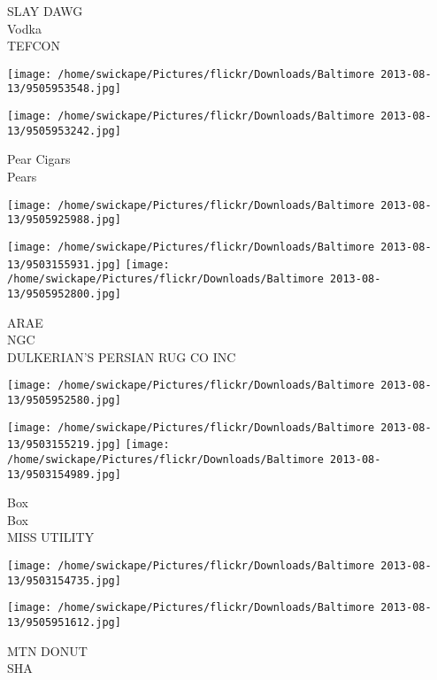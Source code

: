 \documentclass[10pt,letterpaper]{article}
\begin{document}
SLAY DAWG\\
Vodka\\
TEFCON\\
\pagebreak

\texttt{[image: /home/swickape/Pictures/flickr/Downloads/Baltimore 2013-08-13/9505953548.jpg]}

\vspace{0.25in}
\texttt{[image: /home/swickape/Pictures/flickr/Downloads/Baltimore 2013-08-13/9505953242.jpg]}

Pear Cigars\\
Pears\\
\pagebreak

\texttt{[image: /home/swickape/Pictures/flickr/Downloads/Baltimore 2013-08-13/9505925988.jpg]}

\vspace{0.25in}
\texttt{[image: /home/swickape/Pictures/flickr/Downloads/Baltimore 2013-08-13/9503155931.jpg]}
\texttt{[image: /home/swickape/Pictures/flickr/Downloads/Baltimore 2013-08-13/9505952800.jpg]}

ARAE\\
NGC\\
DULKERIAN'S PERSIAN RUG CO INC\\
\pagebreak

\texttt{[image: /home/swickape/Pictures/flickr/Downloads/Baltimore 2013-08-13/9505952580.jpg]}

\vspace{0.25in}
\texttt{[image: /home/swickape/Pictures/flickr/Downloads/Baltimore 2013-08-13/9503155219.jpg]}
\texttt{[image: /home/swickape/Pictures/flickr/Downloads/Baltimore 2013-08-13/9503154989.jpg]}

Box\\
Box\\
MISS UTILITY\\
\pagebreak

\texttt{[image: /home/swickape/Pictures/flickr/Downloads/Baltimore 2013-08-13/9503154735.jpg]}

\vspace{0.25in}
\texttt{[image: /home/swickape/Pictures/flickr/Downloads/Baltimore 2013-08-13/9505951612.jpg]}

MTN DONUT\\
SHA\\
\pagebreak
\end{document}

